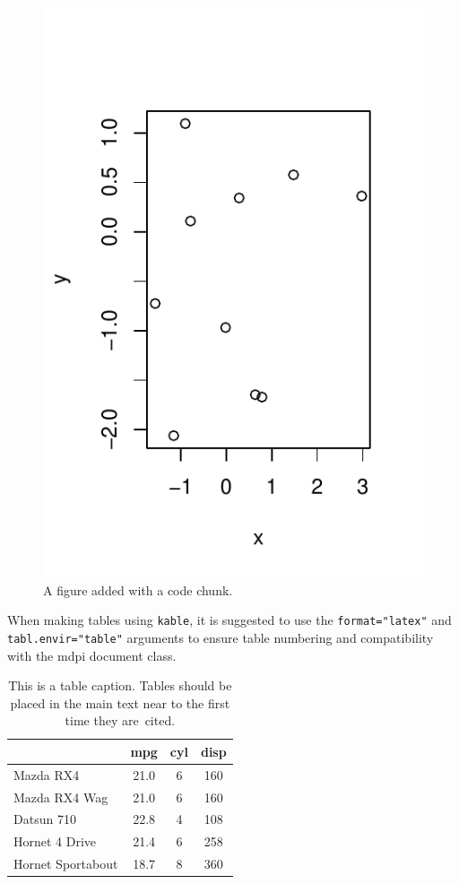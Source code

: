 \documentclass[notspecified,article,submit,moreauthors,pdftex]{Definitions/mdpi}
\begin{document}
\begin{figure}
\centering
\includegraphics{legliv-nutrients_files/figure-latex/fig1-1.pdf}
\caption{A figure added with a code chunk.\label{fig:fig1}}
\end{figure}

When making tables using \texttt{kable}, it is suggested to use the
\texttt{format="latex"} and \texttt{tabl.envir="table"} arguments to
ensure table numbering and compatibility with the mdpi document class.

\begin{table}[H]

\caption{\label{tab:tab1}This is a table caption. Tables should be placed in the 
             main text near to the first time they are~cited.}
\begin{tabular}[t]{lccc}
\toprule
  & mpg & cyl & disp\\
\midrule
Mazda RX4 & 21.0 & 6 & 160\\
Mazda RX4 Wag & 21.0 & 6 & 160\\
Datsun 710 & 22.8 & 4 & 108\\
Hornet 4 Drive & 21.4 & 6 & 258\\
Hornet Sportabout & 18.7 & 8 & 360\\
\bottomrule
\end{tabular}
\end{table}
\end{document}

